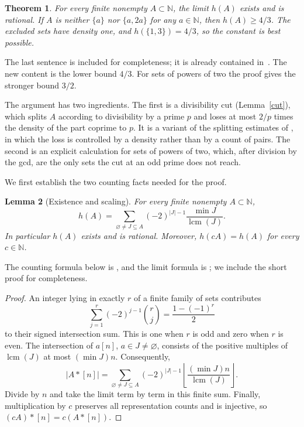 \documentclass[11pt]{article}
\newtheorem{theorem}{Theorem}
\newtheorem{lemma}[theorem]{Lemma}
\newcommand{\N}{\mathbb N}
\newcommand{\lcm}{\operatorname{lcm}}
\begin{document}
\begin{theorem}\label{main}
For every finite nonempty \(A\subset\N\), the limit \(h(A)\) exists and is
rational. If \(A\) is neither \(\{a\}\) nor \(\{a,2a\}\) for any \(a\in\N\),
then \(h(A)\ge4/3\). The excluded sets have density one, and
\(h(\{1,3\})=4/3\), so the constant is best possible.
\end{theorem}

The last sentence is included for completeness; it is already contained
in~\cite[Lemma 5.6]{HP}. The new content is the lower bound \(4/3\). For sets of powers of two the proof
gives the stronger bound \(3/2\).

The argument has two ingredients. The first is a divisibility cut
(Lemma~\ref{cut}), which splits \(A\) according to divisibility by a prime
\(p\) and loses at most \(2/p\) times the density of the part coprime to
\(p\). It is a variant of the splitting estimates of
\cite[Lemma 4.1, Corollary 4.3]{HP}, in which the loss is controlled by a
density rather than by a count of pairs. The second is an explicit
calculation for sets of powers of two, which, after division by the gcd,
are the only sets the cut at an odd prime does not reach.

We first establish the two counting facts needed for the proof.

\begin{lemma}[Existence and scaling]\label{exist}
For every finite nonempty \(A\subset\N\),
\[
h(A)=\sum_{\varnothing\ne J\subseteq A}
       (-2)^{|J|-1}\frac{\min J}{\lcm(J)}.
\]
In particular \(h(A)\) exists and is rational.
Moreover, \(h(cA)=h(A)\) for every \(c\in\N\).
\end{lemma}
The counting formula below is \cite[(2.1)]{KM}, and the limit formula is
\cite[Lemma 1.6]{HP}; we include the short proof for completeness.
\begin{proof}
An integer lying in exactly \(r\) of a finite family of sets contributes
\[
\sum_{j=1}^{r}(-2)^{j-1}\binom rj
=\frac{1-(-1)^r}{2}
\]
to their signed intersection sum. This is one when \(r\) is odd and zero
when \(r\) is even. The intersection of \(a[n]\), \(a\in J\ne\varnothing\),
consists of the positive multiples of \(\lcm(J)\) at most \((\min J)n\).
Consequently,
\[
|A*[n]|=\sum_{\varnothing\ne J\subseteq A}
 (-2)^{|J|-1}\left\lfloor\frac{(\min J)n}{\lcm(J)}\right\rfloor .
\]
Divide by \(n\) and take the limit term by term in this finite sum.
Finally, multiplication by \(c\) preserves all representation counts and
is injective, so \((cA)*[n]=c(A*[n])\).
\end{proof}
\end{document}
